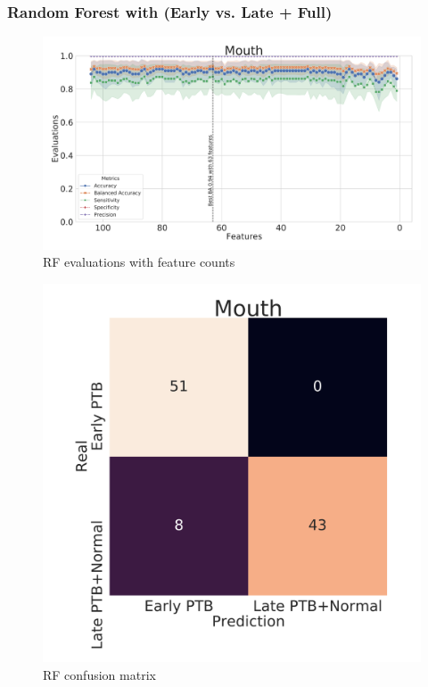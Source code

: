 \documentclass{beamer}
\begin{document}
    \begin{frame}[allowframebreaks]
        \frametitle{Random Forest with (Early vs. Late + Full)}

        \begin{figure}
            \includegraphics[width=0.8 \linewidth]{figures/RandomForest_Proportion/RF-two.DADA2.homd.uncorrected/Mouth+metrics.pdf}
            \caption{RF evaluations with feature counts}
        \end{figure}

        \begin{figure}
            \includegraphics[width=0.5 \linewidth]{figures/RandomForest_Proportion/RF-two.DADA2.homd.uncorrected/Mouth+heatmap.pdf}
            \caption{RF confusion matrix}
        \end{figure}


\end{frame}
\end{document}
